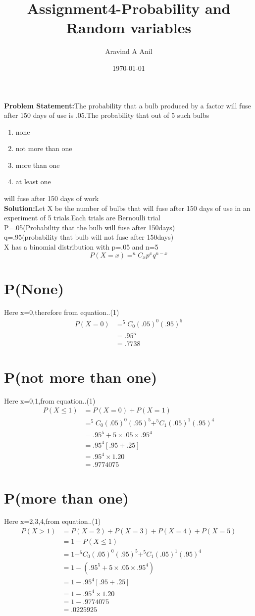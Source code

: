 \documentclass[11pt,a4paper,twocolumn]{article}
\title{\textbf{Assignment4-Probability and Random variables}}
\author{Aravind A Anil}
\date{\today}
\begin{document}
\maketitle
\textbf{Problem Statement:}The probability that a bulb produced by a factor will fuse after 150 days of use is .05.The probability that out of 5 such bulbs
\begin{enumerate}[i]
    \item none
    \item not more than one
    \item more than one
    \item at least one
\end{enumerate}
will fuse after 150 days of work
\\\textbf{Solution:}Let X be the number of bulbs that will fuse after 150 days of use in an experiment of 5 trials.Each trials are Bernoulli trial
\\P=.05(Probability that the bulb will fuse after 150days)
\\q=.95(probability that bulb will not fuse after 150days)
\\X has a binomial distribution with p=.05 and n=5
\begin{equation}
P(X=x)=^{n}C_xp^{x}q^{n-x}
\end{equation}

\section{P(None)}
Here x=0,therefore from equation..(1)
\begin{align*}
P(X=0)&=^{5}C_0(.05)^{0}(.95)^{5}\\
&=.95^{5}\\
&=.7738
\end{align*}
\section{P(not more than one)}
Here x=0,1,from equation..(1)
\begin{align*}
P(X\leq1)&=P(X=0)+P(X=1)\\
&=^{5}C_0(.05)^{0}(.95)^{5}+^{5}C_1(.05)^{1}(.95)^{4}\\
&=.95^{5}+5\times.05\times.95^4\\
&=.95^{4}[.95+.25]\\
&=.95^{4}\times1.20\\
&=.9774075
\end{align*}
\section{P(more than one)}
Here x=2,3,4,from equation..(1)
\begin{align*}
P(X>1)&=P(X=2)+P(X=3)+P(X=4)+P(X=5)\\
&=1-P(X\leq1)\\
&=1-^{5}C_0(.05)^{0}(.95)^{5}+^{5}C_1(.05)^{1}(.95)^{4}\\
&=1-(.95^{5}+5\times.05\times.95^4)\\
&=1-.95^{4}[.95+.25]\\
&=1-.95^{4}\times1.20\\
&=1-.9774075\\
&=.0225925
\end{align*}
\end{document}

